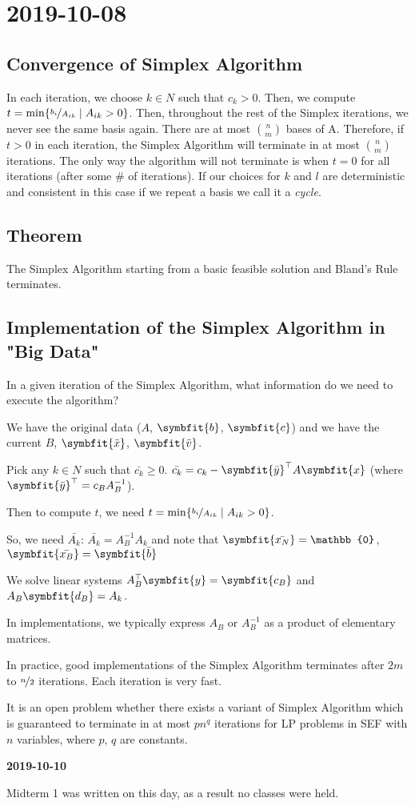 \section{2019-10-08}
\subsection{Convergence of Simplex Algorithm}
In each iteration, we choose $k\in N$ such that $c_k>0$. Then, we compute 
$t=\min\{\nicefrac{b_i}{A_{ik}}\mid A_{ik}>0\}$. Then, throughout the
rest of the Simplex iterations, we never see the same basis again. 
There are at most $\binom{n}{m}$ bases of A. Therefore, if $t>0$ in each iteration,
the Simplex Algorithm will terminate in at most $\binom{n}{m}$ iterations. The only
way the algorithm will not terminate is when $t=0$ for all iterations
(after some \# of iterations). If our choices for $k$ and $l$ are deterministic and
consistent in this case if we repeat a basis we call it a \emph{cycle}.

\begin{thmbox}
    \subsection{Theorem}
    The Simplex Algorithm starting from a basic feasible solution and
    Bland's Rule terminates.
\end{thmbox}

\subsection{Implementation of the Simplex Algorithm in "Big Data"}
In a given iteration of the Simplex Algorithm, what information do we need to
execute the algorithm?


We have the original data ($A$, $\symbfit{b}$, $\symbfit{c}$) and we have the
current $B$, $\symbfit{\bar{x}}$, $\symbfit{\bar{v}}$.

Pick any $k\in N$ such that $\bar{c_k}\ge 0$. $\bar{c_k}=c_k-\symbfit{\bar{y}}^\top  A\symbfit{x}$ 
(where $\symbfit{\bar{y}}^\top =c_B A_B^{-1}$).

Then to compute $t$, we need
$t=\min\{\nicefrac{b_i}{A_{ik}}\mid A_{ik}>0\}$.

So, we need
$\bar{A_k}$: $\bar{A_k}=A_B^{-1}A_k$ and note that $\symbfit{\bar{x_N}}=\mathbb{0}$,
$\symbfit{\bar{x_B}}=\symbfit{\bar{b}}$


We solve linear systems $A_B^\top \symbfit{y}=\symbfit{c_B}$ and $A_B\symbfit{d_B}=A_k$.

In implementations, we typically express $A_B$ or $A_B^{-1}$ as a product of elementary
matrices.

In practice, good implementations of the Simplex Algorithm terminates after $2m$ to
$\nicefrac{n}{2}$ iterations. Each iteration is very fast.

It is an open problem whether there exists a variant of Simplex Algorithm which is
guaranteed to terminate in at most $pn^q$ iterations for LP problems in SEF with $n$
variables, where $p$, $q$ are constants.

\textbf{2019-10-10}

Midterm 1 was written on this day, as a result no classes were
held.